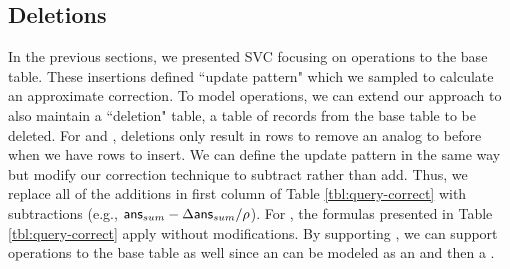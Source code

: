\subsection{Deletions}\label{sec:del}
In the previous sections, we presented SVC focusing on \insertion operations to the base table.
These insertions defined ``update pattern" which we sampled to calculate an approximate correction.
To model \delete operations, we can extend our approach to also maintain a ``deletion" table, a table of records from the base table to be deleted. 
For \fjview and \spview, deletions only result in rows to remove an analog to before when we have rows to insert.
We can define the update pattern in the same way but modify our correction technique to subtract rather than add.
Thus, we replace all of the additions in first column of Table \ref{tbl:query-correct} with subtractions  (e.g., $\textsf{ans}_{sum}-\Delta\textsf{ans}_{sum}/\rho $).
For \aggview, the formulas presented in Table \ref{tbl:query-correct} apply without modifications. 
By supporting \delete, we can support \update operations to the base table as well since an \update can be modeled as an \insertion and then a \delete.
